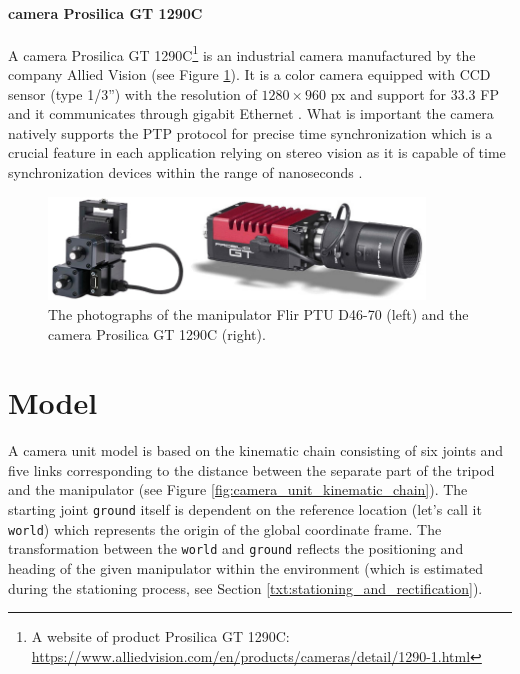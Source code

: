 \paragraph{camera Prosilica GT 1290C} A camera Prosilica GT 1290C\footnote{A website of product Prosilica GT 1290C: \url{https://www.alliedvision.com/en/products/cameras/detail/1290-1.html}} is an industrial camera manufactured by the company Allied Vision (see Figure \ref{fig:prosilica_gt1290c_flir_ptud4670}). It is a color camera equipped with CCD sensor (type 1/3'') with the resolution of $1280 \times 960$ px and support for $33.3$ FP and it communicates through gigabit Ethernet \cite{Prosilica_gt1290c}. What is important the camera natively supports the PTP protocol for precise time synchronization which is a crucial feature in each application relying on stereo vision as it is capable of time synchronization devices within the range of nanoseconds \cite{PTP}.

\begin{figure}[htb]
	\centering
	\includegraphics[width=10cm]{fig/prosilica_gt1290c_flir_ptud4670.jpg}
	\caption{The photographs of the manipulator Flir PTU D46-70 (left) and the camera Prosilica GT 1290C (right).}
	\label{fig:prosilica_gt1290c_flir_ptud4670}
\end{figure}

\section{Model} \label{txt:model}

A camera unit model is based on the kinematic chain consisting of six joints and five links corresponding to the distance between the separate part of the tripod and the manipulator (see Figure \ref{fig:camera_unit_kinematic_chain}). The starting joint \texttt{ground} itself is dependent on the reference location (let's call it \texttt{world}) which represents the origin of the global coordinate frame. The transformation between the \texttt{world} and \texttt{ground} reflects the positioning and heading of the given manipulator within the environment (which is estimated during the stationing process, see Section \ref{txt:stationing_and_rectification}).

